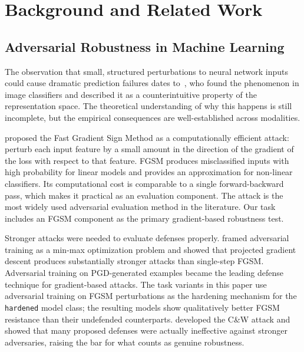 \documentclass[11pt]{article}
\begin{document}
\section{Background and Related Work}
\label{sec:related}

\subsection{Adversarial Robustness in Machine Learning}

The observation that small, structured perturbations to neural network inputs
could cause dramatic prediction failures dates to~\citet{szegedy2014intriguing},
who found the phenomenon in image classifiers and described it as a
counterintuitive property of the representation space. The theoretical
understanding of why this happens is still incomplete, but the empirical
consequences are well-established across modalities.

\citet{goodfellow2015explaining} proposed the Fast Gradient Sign Method
as a computationally efficient attack: perturb each input feature by a small
amount in the direction of the gradient of the loss with respect to that
feature. FGSM produces misclassified inputs with high probability for linear
models and provides an approximation for non-linear classifiers. Its
computational cost is comparable to a single forward-backward pass, which
makes it practical as an evaluation component. The attack is the most widely
used adversarial evaluation method in the literature. Our task includes an
FGSM component as the primary gradient-based robustness test.

Stronger attacks were needed to evaluate defenses properly.
\citet{madry2018towards} framed adversarial training as a min-max
optimization problem and showed that projected gradient descent produces
substantially stronger attacks than single-step FGSM. Adversarial training on
PGD-generated examples became the leading defense technique for gradient-based
attacks. The task variants in this paper use adversarial training on FGSM
perturbations as the hardening mechanism for the \texttt{hardened} model
class; the resulting models show qualitatively better FGSM resistance than
their undefended counterparts. \citet{carlini2017evaluating} developed the
C\&W attack and showed that many proposed defenses were actually ineffective
against stronger adversaries, raising the bar for what counts as genuine
robustness.
\end{document}
